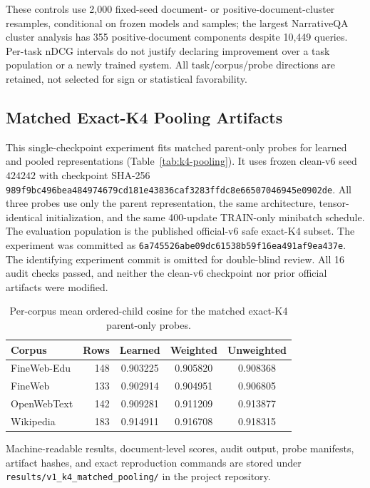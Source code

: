 \documentclass[10pt]{article}
\begin{document}
These controls use 2,000 fixed-seed document- or positive-document-cluster
resamples, conditional on frozen models and samples; the largest NarrativeQA
cluster analysis has 355 positive-document components despite 10,449 queries.
Per-task nDCG intervals do not justify declaring improvement over a task
population or a newly trained system. All task/corpus/probe directions are
retained, not selected for sign or statistical favorability.

\subsection{Matched Exact-K4 Pooling Artifacts}

This single-checkpoint experiment fits matched parent-only probes for learned
and pooled representations (Table~\ref{tab:k4-pooling}). It uses frozen clean-v6 seed \(424242\) with
checkpoint SHA-256
\nolinkurl{989f9bc496bea484974679cd181e43836caf3283ffdc8e66507046945e0902de}.
All three probes use only the parent representation, the same architecture,
tensor-identical initialization, and the same 400-update TRAIN-only minibatch
schedule. The evaluation population is the published official-v6 safe
exact-K4 subset.
\ifdefined\papreprint
The experiment was committed as
\nolinkurl{6a745526abe09dc61538b59f16ea491af9ea437e}.
\else
The identifying experiment commit is omitted for double-blind review.
\fi
All 16 audit checks passed, and neither the clean-v6 checkpoint nor prior
official artifacts were modified.

\begin{table}[H]
\caption{Per-corpus mean ordered-child cosine for the matched exact-K4
parent-only probes.}
\label{tab:k4-pooling-corpus}
\centering
\small
\begin{tabular}{l r c c c}
\toprule
\textbf{Corpus} & \textbf{Rows} & \textbf{Learned} &
\textbf{Weighted} & \textbf{Unweighted} \\
\midrule
FineWeb-Edu & 148 & 0.903225 & 0.905820 & 0.908368 \\
FineWeb & 133 & 0.902914 & 0.904951 & 0.906805 \\
OpenWebText & 142 & 0.909281 & 0.911209 & 0.913877 \\
Wikipedia & 183 & 0.914911 & 0.916708 & 0.918315 \\
\bottomrule
\end{tabular}
\end{table}

Machine-readable results, document-level scores, audit output, probe manifests,
artifact hashes, and exact reproduction commands are stored under
\texttt{results/v1\_k4\_matched\_pooling/} in the project repository.
\end{document}
